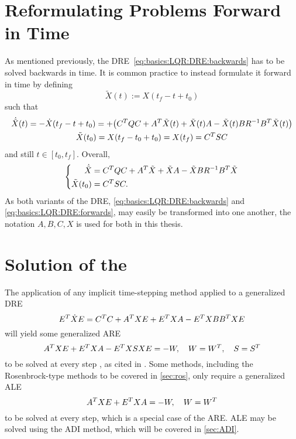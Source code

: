 \section{Reformulating Problems Forward in Time}
\label{sec:basics:tdir}

As mentioned previously, the \ac{DRE}~\eqref{eq:basics:LQR:DRE:backwards} has to be solved backwards in time.
It is common practice to instead formulate it forward in time by defining
\begin{equation}
  \tilde X(t) := X(t_f - t + t_0)
\end{equation}
such that
\begin{equation}
\begin{gathered}
  \dot{\tilde X}(t)
  = - \dot X(t_f - t + t_0)
  = + \big( C^T Q C + A^T \tilde X(t) + \tilde X(t) A - \tilde X(t) B R^{-1} B^T \tilde X(t) \big)
  \\
  \tilde X(t_0)
  = X(t_f - t_0 + t_0)
  = X(t_f)
  = C^T S C
\end{gathered}
\end{equation}
and still $t \in [t_0, t_f]$.
Overall,
\begin{equation}
\label{eq:basics:LQR:DRE:forwards}
\left\{
\begin{aligned}
  \dot{\tilde X} &= C^T Q C + A^T \tilde X + \tilde X A - \tilde X B R^{-1} B^T \tilde X \\
  \tilde X(t_0) &= C^T S C
  .
\end{aligned}
\right.
\end{equation}
As both variants of the \ac{DRE},
\eqref{eq:basics:LQR:DRE:backwards} and
\eqref{eq:basics:LQR:DRE:forwards},
may easily be transformed into one another,
the notation $A, B, C, X$ is used for both in this thesis.

\section{Solution of the \texorpdfstring{}{DRE}}
\label{sec:basics:matrixeqs}

The application of
any implicit time-stepping method applied to a generalized \ac{DRE}
\begin{equation}
\label{eq:basics:DRE}
  E^T \dot X E = C^T C + A^T X E + E^T X A - E^T X BB^T X E
\end{equation}
will yield some generalized \ac{ARE}
\begin{equation}
\label{eq:basics:ARE}
    A^T X E + E^T X A - E^T X S X E = -W,
    \quad
    W = W^T,
    \quad
    S = S^T
\end{equation}
to be solved at every step \cite{Dieci1992},
as cited in \cite[50]{Lang2015}.
Some methods, including the Rosenbrock-type methods to be covered in \autoref{sec:ros},
only require a generalized \ac{ALE}
\begin{equation}
\label{eq:basics:ALE}
  A^T X E + E^T X A = -W,
  \quad
  W = W^T
\end{equation}
to be solved at every step,
which is a special case of the \ac{ARE}.
\ac{ALE} may be solved \eg using the \ac{ADI} method,
which will be covered in \autoref{sec:ADI}.

